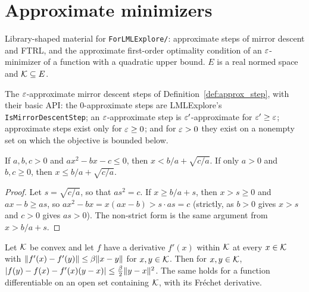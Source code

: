 \chapter{Approximate minimizers}
\label{chap:prereq_approx}

Library-shaped material for \texttt{ForLMLExplore/}: approximate steps of mirror descent and FTRL,
and the approximate first-order optimality condition of an $\varepsilon$-minimizer of a function with
a quadratic upper bound. $E$ is a real normed space and $\mathcal{K} \subseteq E$.

\begin{definition}
  \label{def:approx_step_lib}
  \leanok
  The $\varepsilon$-approximate mirror descent steps of Definition~\ref{def:approx_step}, with their basic
  API: the $0$-approximate steps are LMLExplore's \texttt{IsMirrorDescentStep}; an
  $\varepsilon$-approximate step is $\varepsilon'$-approximate for $\varepsilon' \ge \varepsilon$; approximate steps exist only
  for $\varepsilon \ge 0$; and for $\varepsilon > 0$ they exist on a nonempty set on which the objective is
  bounded below.
\end{definition}

\begin{lemma}
  \label{lem:solve_quadratic}
  \leanok
  If $a, b, c > 0$ and $a x^2 - b x - c \le 0$, then $x < b/a + \sqrt{c/a}$. If only $a > 0$ and
  $b, c \ge 0$, then $x \le b/a + \sqrt{c/a}$.
\end{lemma}

\begin{proof}
  \leanok
  Let $s = \sqrt{c/a}$, so that $a s^2 = c$. If $x \ge b/a + s$, then $x > s \ge 0$ and
  $a x - b \ge a s$, so $a x^2 - b x = x(ax - b) > s \cdot a s = c$ (strictly, as $b > 0$ gives
  $x > s$ and $c > 0$ gives $as > 0$). The non-strict form is the same argument from $x > b/a + s$.
\end{proof}

\begin{lemma}
  \label{lem:smooth_quadratic_bound}
  \leanok
  Let $\mathcal{K}$ be convex and let $f$ have a derivative $f'(x)$ within $\mathcal{K}$ at every $x \in \mathcal{K}$ with
  $\lVert f'(x) - f'(y) \rVert \le \beta \lVert x - y \rVert$ for $x, y \in \mathcal{K}$. Then for $x, y \in \mathcal{K}$,
  $\lvert f(y) - f(x) - f'(x)(y - x) \rvert \le \frac\beta2 \lVert y - x \rVert^2$. The same holds for a function
  differentiable on an open set containing $\mathcal{K}$, with its Fréchet derivative.
\end{lemma}

